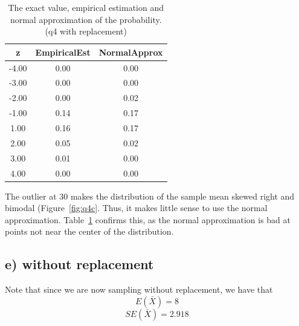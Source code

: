 \documentclass[11pt]{article}
\begin{document}
\begin{table}[H]
\centering
\begin{tabular}{|c|cc|}
  \hline
z & EmpiricalEst & NormalApprox \\ 
  \hline
-4.00 & 0.00 & 0.00 \\ 
  -3.00 & 0.00 & 0.00 \\ 
  -2.00 & 0.00 & 0.02 \\ 
  -1.00 & 0.14 & 0.17 \\ 
  1.00 & 0.16 & 0.17 \\ 
  2.00 & 0.05 & 0.02 \\ 
  3.00 & 0.01 & 0.00 \\ 
  4.00 & 0.00 & 0.00 \\ 
   \hline
\end{tabular}
\caption{The exact value, empirical estimation and normal approximation of the probability.(q4 with replacement)} \label{tab:q4c}
\end{table}

\noindent The outlier at $30$ makes the distribution of the sample mean skewed right and bimodal (Figure~\ref{fig:q4c}.  Thus, it makes little sense to use the normal approximation.  Table~\ref{tab:q4c} confirms this, as the normal approximation is bad at points not near the center of the distribution.



\subsection*{e) without replacement}


\noindent Note that since we are now sampling without replacement, we have that
$$E(\bar{X})= 8$$ 
$$SE(\bar{X}) = 2.918$$
\end{document}
